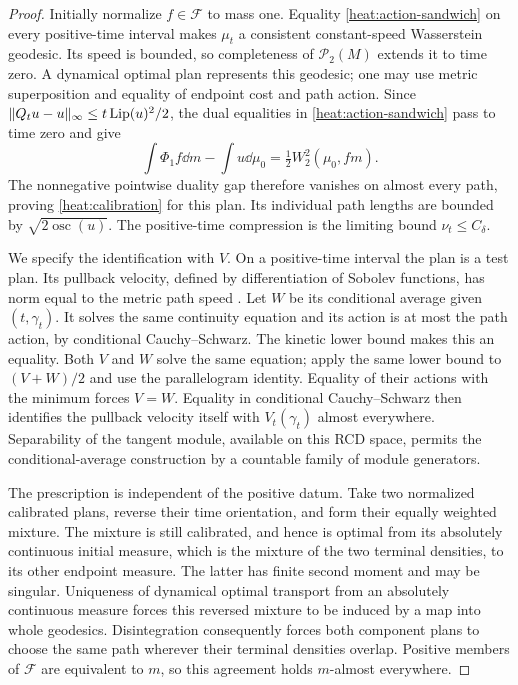 \begin{proof}
Initially normalize \(f\in\mathcal F\) to mass one.
Equality \eqref{heat:action-sandwich} on every positive-time
interval makes \(\mu_t\) a consistent constant-speed
Wasserstein geodesic. Its speed is bounded, so completeness
of \(\mathcal P_2(M)\) extends it to time zero. A dynamical
optimal plan represents this geodesic; one may use metric
superposition \cite[Proposition~2.1]{GigliHan2015} and equality
of endpoint cost and path action. Since
\(\|Q_tu-u\|_\infty\le t\operatorname{Lip}(u)^2/2\), the dual equalities
in \eqref{heat:action-sandwich} pass to time zero and give
\[
\int\Phi_1 f\dd m-\int u\dd\mu_0
=\tfrac12W_2^2(\mu_0,fm).
\]
The nonnegative pointwise duality gap therefore vanishes on
almost every path, proving \eqref{heat:calibration} for this
plan. Its individual path lengths are bounded by
\(\sqrt{2\operatorname{osc}(u)}\). The positive-time
compression is the limiting bound
\(\nu_t\le C_\delta\).

We specify the identification with \(V\). On a positive-time
interval the plan is a test plan. Its pullback velocity,
defined by differentiation of Sobolev functions, has norm
equal to the metric path speed
\cite[Theorem/Definition~2.33]{GigliDifferentialStructure}.
Let \(W\) be its conditional average given \((t,\gamma_t)\).
It solves the same continuity equation and its action is at
most the path action, by conditional Cauchy--Schwarz. The
kinetic lower bound makes this an equality. Both \(V\) and
\(W\) solve the same equation; apply the same lower bound to
\((V+W)/2\) and use the parallelogram identity. Equality of
their actions with the minimum forces \(V=W\). Equality in
conditional Cauchy--Schwarz then identifies the pullback
velocity itself with \(V_t(\gamma_t)\) almost everywhere.
Separability of the tangent module, available on this RCD
space, permits the conditional-average construction by a
countable family of module generators.

The prescription is independent of the positive datum.
Take two normalized calibrated plans, reverse their time
orientation, and form their equally weighted mixture. The
mixture is still calibrated, and hence is optimal from its
absolutely continuous initial measure, which is the mixture
of the two terminal densities, to its other endpoint
measure. The latter has finite second moment and may be
singular. Uniqueness of dynamical optimal transport from an
absolutely continuous measure
\cite[Theorem~1.1]{GigliRajalaSturm2016} forces this reversed
mixture to be induced by a map into whole geodesics.
Disintegration consequently forces both component plans to
choose the same path wherever their terminal densities
overlap. Positive members of \(\mathcal F\) are equivalent
to \(m\), so this agreement holds \(m\)-almost everywhere.


\end{proof}
